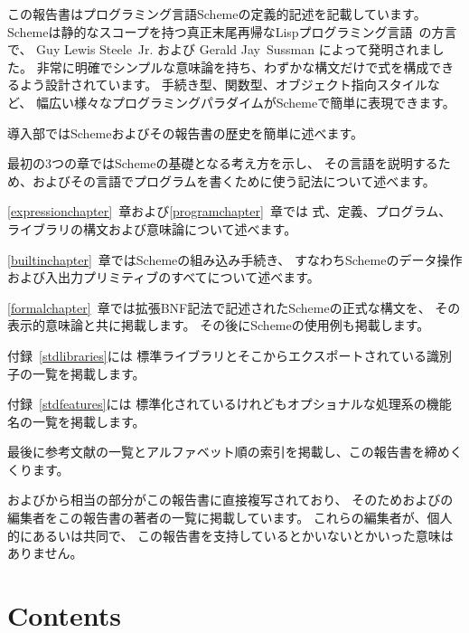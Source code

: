 この報告書はプログラミング言語Schemeの定義的記述を記載しています。
Schemeは静的なスコープを持つ真正末尾再帰なLispプログラミング言語~\cite{McCarthy}の方言で、
Guy Lewis Steele~Jr. および Gerald Jay~Sussman によって発明されました。
非常に明確でシンプルな意味論を持ち、わずかな構文だけで式を構成できるよう設計されています。
手続き型、関数型、オブジェクト指向スタイルなど、
幅広い様々なプログラミングパラダイムがSchemeで簡単に表現できます。

\vest 導入部ではSchemeおよびその報告書の歴史を簡単に述べます。

\vest 最初の3つの章ではSchemeの基礎となる考え方を示し、
その言語を説明するため、およびその言語でプログラムを書くために使う記法について述べます。

\vest \ref{expressionchapter}~章および\ref{programchapter}~章では
式、定義、プログラム、ライブラリの構文および意味論について述べます。

\vest \ref{builtinchapter}~章ではSchemeの組み込み手続き、
すなわちSchemeのデータ操作および入出力プリミティブのすべてについて述べます。

\vest \ref{formalchapter}~章では拡張BNF記法で記述されたSchemeの正式な構文を、
その表示的意味論と共に掲載します。
その後にSchemeの使用例も掲載します。

\vest 付録~\ref{stdlibraries}には
標準ライブラリとそこからエクスポートされている識別子の一覧を掲載します。

\vest 付録~\ref{stdfeatures}には
標準化されているけれどもオプショナルな処理系の機能名の一覧を掲載します。


\vest 最後に参考文献の一覧とアルファベット順の索引を掲載し、この報告書を締めくくります。

\begin{note}
\rfivers{}および\rsixrs{}から相当の部分がこの報告書に直接複写されており、
そのため\rfivers{}および\rsixrs{}の編集者をこの報告書の著者の一覧に掲載しています。
これらの編集者が、個人的にあるいは共同で、
この報告書を支持しているとかいないとかいった意味はありません。
\end{note}


\vfill
\eject

\chapter*{Contents}
\addvspace{3.5pt}                  %
\renewcommand{\tocshrink}{-3.5pt}  %
{\footnotesize
\tableofcontents
}

\vfill
\eject
